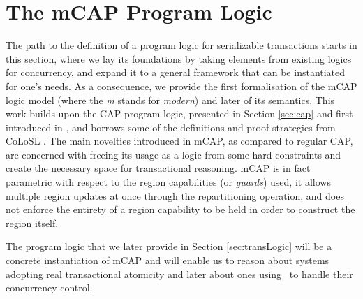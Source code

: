 \chapter{The mCAP Program Logic}

\label{sec:mcapModel}

The path to the definition of a program logic for serializable transactions starts in this section, where we lay its foundations by taking elements from existing logics for concurrency, and expand it to a general framework that can be instantiated for one's needs. As a consequence, we provide the first formalisation of the mCAP logic model (where the \textit{m} stands for \textit{modern}) and later of its semantics. This work builds upon the CAP program logic, presented in Section \ref{sec:cap} and first introduced in \cite{cap}, and borrows some of the definitions and proof strategies from CoLoSL \cite{colosl} \cite{azaleaThesis}. The main novelties introduced in mCAP, as compared to regular CAP, are concerned with freeing its usage as a logic from some hard constraints and create the necessary space for transactional reasoning. mCAP is in fact parametric with respect to the region capabilities (or \textit{guards}) used, it allows multiple region updates at once through the repartitioning operation, and does not enforce the entirety of a region capability to be held in order to construct the region itself.

The program logic that we later provide in Section \ref{sec:transLogic} will be a concrete instantiation of mCAP and will enable us to reason about systems adopting real transactional atomicity and later about ones using \tpl\ to handle their concurrency control.





